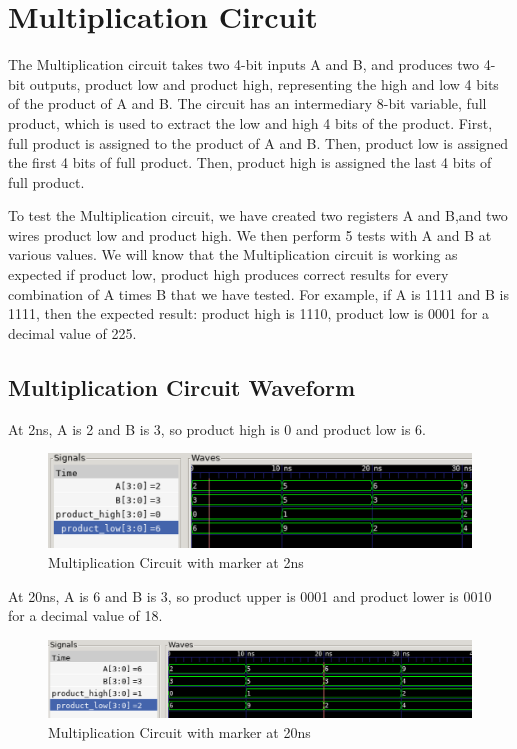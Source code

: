 \documentclass[12pt]{article}
\begin{document}
\section{Multiplication Circuit}
The Multiplication circuit takes two 4-bit inputs A and B, and produces two 4-bit outputs, product low and product high, representing the high and low 4 bits of the product of A and B. The circuit has an intermediary 8-bit variable, full product, which is used to extract the low and high 4 bits of the product. First, full product is assigned to the product of A and B. Then, product low is assigned the first 4 bits of full product. Then, product high is assigned the last 4 bits of full product. 
 

To test the Multiplication circuit, we have created two registers A and B,and two wires product low and product high. We then perform 5 tests with A and B at various values. We will know that the Multiplication circuit is working as expected if product low, product high produces correct results for every combination of A times B that we have tested. For example, if A is 1111 and B is 1111, then the expected result: product high is 1110, product low is 0001 for a decimal value of 225.

\subsection{Multiplication Circuit Waveform} 

At 2ns, A is 2 and B is 3, so product high is 0 and product low is 6.  
\begin{figure}[H]
 \centering
 \includegraphics[width = 1.0\textwidth]{Multiplication/multiplication_wave.png}
 \caption{Multiplication Circuit with marker at 2ns}
 \label{fig:enter-label} 
\end{figure} 

At 20ns, A is 6 and B is 3, so product upper is 0001 and product lower is 0010 for a decimal value of 18.  
 \begin{figure}[H]
 \centering 
\includegraphics[width = 1.0\textwidth]{Multiplication/multiplication_wave1.png}
 \caption{Multiplication Circuit with marker at 20ns}
 \label{fig:enter-label}
 \end{figure}
\end{document}
